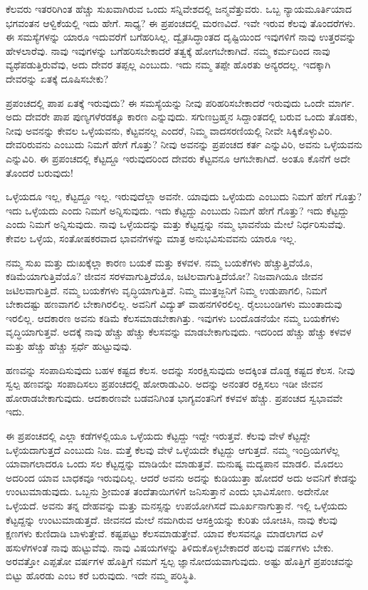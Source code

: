 ಕೆಲವರು ಇತರರಿಗಿಂತ ಹೆಚ್ಚು ಸುಖವಾಗಿರುವ ಒಂದು ಸನ್ನಿವೇಶದಲ್ಲಿ ಜನ್ಮವೆತ್ತುವರು. ಒಬ್ಬ ನ್ಯಾಯಮೂರ್ತಿಯಾದ ಭಗವಂತನ ಆಳ್ವಿಕೆಯಲ್ಲಿ ಇದು ಹೇಗೆ. ಸಾಧ್ಯ? ಈ ಪ್ರಪಂಚದಲ್ಲಿ ಮರಣವಿದೆ. ಇವೇ ಇರುವ ಕೆಲವು ತೊಂದರೆಗಳು. ಈ ಸಮಸ್ಯೆಗಳನ್ನು ಯಾರೂ ಇದುವರೆಗೆ ಬಗೆಹರಿಸಿಲ್ಲ. ದ್ವೈತಸಿದ್ಧಾಂತದ ದೃಷ್ಟಿಯಿಂದ ಇವುಗಳಿಗೆ ನಾವು ಉತ್ತರವನ್ನು ಹೇಳಲಾರೆವು. ನಾವು ಇವುಗಳನ್ನು ಬಗೆಹರಿಸಬೇಕಾದರೆ ತತ್ವಕ್ಕೆ ಹೋಗಬೇಕಾಗಿದೆ. ನಮ್ಮ ಕರ್ಮದಿಂದ ನಾವು ವ್ಯಥೆಪಡುತ್ತಿರುವೆವು, ಅದು ದೇವರ ತಪ್ಪಲ್ಲ ಎಂಬುದು. ಇದು ನಮ್ಮ ತಪ್ಪೇ ಹೊರತು ಅನ್ಯರದಲ್ಲ. ಇದಕ್ಕಾಗಿ ದೇವರನ್ನು ಏತಕ್ಕೆ ದೂಷಿಸಬೇಕು?

ಪ್ರಪಂಚದಲ್ಲಿ ಪಾಪ ಏತಕ್ಕೆ ಇರುವುದು? ಈ ಸಮಸ್ಯೆಯನ್ನು ನೀವು ಪರಿಹರಿಸಬೇಕಾದರೆ ಇರುವುದು ಒಂದೇ ಮಾರ್ಗ. ಅದು ದೇವರೇ ಪಾಪ ಪುಣ್ಯಗಳೆರಡಕ್ಕೂ ಕಾರಣ ಎನ್ನುವುದು. ಸಗುಣಬ್ರಹ್ಮನ ಸಿದ್ದಾಂತದಲ್ಲಿ ಬರುವ ಒಂದು ತೊಡಕು, ನೀವು ಅವನನ್ನು ಕೇವಲ ಒಳ್ಳೆಯವನು, ಕೆಟ್ಟವನಲ್ಲ ಎಂದರೆ, ನಿಮ್ಮ ವಾದಸರಣಿಯಲ್ಲಿ ನೀವೇ ಸಿಕ್ಕಿಕೊಳ್ಳುವಿರಿ. ದೇವರಿರುವನು ಎಂಬುದು ನಿಮಗೆ ಹೇಗೆ ಗೊತ್ತು? ನೀವು ಅವನನ್ನು ಪ್ರಪಂಚದ ಕರ್ತ ಎನ್ನುವಿರಿ, ಅವನು ಒಳ್ಳೆಯವನು ಎನ್ನುವಿರಿ. ಈ ಪ್ರಪಂಚದಲ್ಲಿ ಕೆಟ್ಟದ್ದೂ ಇರುವುದರಿಂದ ದೇವರು ಕೆಟ್ಟವನೂ ಆಗಬೇಕಾಗಿದೆ. ಅಂತೂ ಕೊನೆಗೆ ಅದೇ ತೊಂದರೆ ಬರುವುದು!

ಒಳ್ಳೆಯದೂ ಇಲ್ಲ, ಕೆಟ್ಟದ್ದೂ ಇಲ್ಲ. ಇರುವುದೆಲ್ಲಾ ಅವನೇ. ಯಾವುದು ಒಳ್ಳೆಯದು ಎಂಬುದು ನಿಮಗೆ ಹೇಗೆ ಗೊತ್ತು? ಇದು ಒಳ್ಳೆಯದು ಎಂದು ನಿಮಗೆ ಅನ್ನಿಸುವುದು. ಇದು ಕೆಟ್ಟದ್ದು ಎಂಬುದು ನಿಮಗೆ ಹೇಗೆ ಗೊತ್ತು? ಇದು ಕೆಟ್ಟದ್ದು ಎಂದು ನಿಮಗೆ ಅನ್ನಿಸುವುದು. ನಾವು ಒಳ್ಳೆಯದನ್ನು ಮತ್ತು ಕೆಟ್ಟದ್ದನ್ನು ನಮ್ಮ ಭಾವನೆಯ ಮೇಲೆ ನಿರ್ಧರಿಸುವೆವು. ಕೇವಲ ಒಳ್ಳೆಯ, ಸಂತೋಷಕರವಾದ ಭಾವನೆಗಳನ್ನು ಮಾತ್ರ ಅನುಭವಿಸುವವನು ಯಾರೂ ಇಲ್ಲ.

ನಮ್ಮ ಸುಖ ಮತ್ತು ದುಃಖಕ್ಕೆಲ್ಲಾ ಕಾರಣ ಬಯಕೆ ಮತ್ತು ಕಳವಳ. ನಮ್ಮ ಬಯಕೆಗಳು ಹೆಚ್ಚುತ್ತಿವೆಯೊ, ಕಡಿಮೆಯಾಗುತ್ತಿವೆಯೊ? ಜೀವನ ಸರಳವಾಗುತ್ತಿದೆಯೊ, ಜಟಿಲವಾಗುತ್ತಿದೆಯೋ? ನಿಜವಾಗಿಯೂ ಜೀವನ ಜಟಿಲವಾಗುತ್ತಿದೆ. ನಮ್ಮ ಬಯಕೆಗಳು ವೃದ್ಧಿಯಾಗುತ್ತಿವೆ. ನಿಮ್ಮ ಮುತ್ತಜ್ಜನಿಗೆ ನಿಮ್ಮ ಉಡುಪಾಗಲಿ, ನಿಮಗೆ ಬೇಕಾದಷ್ಟು ಹಣವಾಗಲಿ ಬೇಕಾಗಿರಲಿಲ್ಲ. ಅವನಿಗೆ ವಿದ್ಯುತ್ ವಾಹನಗಳಿರಲಿಲ್ಲ. ರೈಲುಬಂಡಿಗಳು ಮುಂತಾದುವು ಇರಲಿಲ್ಲ. ಆದಕಾರಣ ಅವನು ಕಡಿಮೆ ಕೆಲಸಮಾಡಬೇಕಾಗಿತ್ತು. ಇವುಗಳು ಬಂದೊಡನೆಯೇ ನಮ್ಮ ಬಯಕೆಗಳು ವೃದ್ಧಿಯಾಗುತ್ತವೆ. ಅದಕ್ಕೆ ನಾವು ಹೆಚ್ಚು ಹೆಚ್ಚು ಕೆಲಸವನ್ನು ಮಾಡಬೇಕಾಗುವುದು. ಇದರಿಂದ ಹೆಚ್ಚು ಹೆಚ್ಚು ಕಳವಳ ಮತ್ತು ಹೆಚ್ಚು ಹೆಚ್ಚು ಸ್ಪರ್ಧೆ ಹುಟ್ಟುವುವು.

ಹಣವನ್ನು ಸಂಪಾದಿಸುವುದು ಬಹಳ ಕಷ್ಟದ ಕೆಲಸ. ಅದನ್ನು ಸಂರಕ್ಷಿಸುವುದು ಅದಕ್ಕಿಂತ ದೊಡ್ಡ ಕಷ್ಟದ ಕೆಲಸ. ನೀವು ಸ್ವಲ್ಪ ಹಣವನ್ನು ಸಂಪಾದಿಸಲು ಪ್ರಪಂಚದಲ್ಲಿ ಹೋರಾಡುವಿರಿ. ಅದನ್ನು ಅನಂತರ ರಕ್ಷಿಸಲು ಇಡೀ ಜೀವನ ಹೋರಾಡಬೇಕಾಗುವುದು. ಆದಕಾರಣವೇ ಬಡವನಿಗಿಂತ ಭಾಗ್ಯವಂತನಿಗೆ ಕಳವಳ ಹೆಚ್ಚು. ಪ್ರಪಂಚದ ಸ್ವಭಾವವೇ ಇದು.

ಈ ಪ್ರಪಂಚದಲ್ಲಿ ಎಲ್ಲಾ ಕಡೆಗಳಲ್ಲಿಯೂ ಒಳ್ಳೆಯದು ಕೆಟ್ಟದ್ದು ಇದ್ದೇ ಇರುತ್ತವೆ. ಕೆಲವು ವೇಳೆ ಕೆಟ್ಟದ್ದೇ ಒಳ್ಳೆಯದಾಗುತ್ತದೆ ಎಂಬುದು ನಿಜ. ಮತ್ತೆ ಕೆಲವು ವೇಳೆ ಒಳ್ಳೆಯದೇ ಕೆಟ್ಟದ್ದು ಆಗುತ್ತದೆ. ನಮ್ಮ ಇಂದ್ರಿಯಗಳೆಲ್ಲ ಯಾವಾಗಲಾದರೂ ಒಂದು ಸಲ ಕೆಟ್ಟದ್ದನ್ನು ಮಾಡಿಯೇ ಮಾಡುತ್ತವೆ. ಮನುಷ್ಯ ಮದ್ಯಪಾನ ಮಾಡಲಿ. ಮೊದಲು ಅದರಿಂದ ಯಾವ ಬಾಧಕವೂ ಇರುವುದಿಲ್ಲ. ಆದರೆ ಅವನು ಅದನ್ನು ಕುಡಿಯುತ್ತಾ ಹೋದರೆ ಅದು ಅವನಿಗೆ ಕೇಡನ್ನು ಉಂಟುಮಾಡುವುದು. ಒಬ್ಬನು ಶ‍್ರೀಮಂತ ತಂದೆತಾಯಿಗಳಿಗೆ ಜನಿಸುತ್ತಾನೆ ಎಂದು ಭಾವಿಸೋಣ. ಅದೇನೋ ಒಳ್ಳೆಯದೆ. ಅವನು ತನ್ನ ದೇಹವನ್ನು ಮತ್ತು ಮನಸ್ಸನ್ನು ಉಪಯೋಗಿಸದೆ ಮೂರ್ಖನಾಗುತ್ತಾನೆ. ಇಲ್ಲಿ ಒಳ್ಳೆಯದು ಕೆಟ್ಟದ್ದನ್ನು ಉಂಟುಮಾಡುತ್ತದೆ. ಜೀವನದ ಮೇಲೆ ನಮಗಿರುವ ಆಸಕ್ತಿಯನ್ನು ಕುರಿತು ಯೋಚಿಸಿ, ನಾವು ಕೆಲವು ಕ್ಷಣಗಳು ಕುಣಿದಾಡಿ ಬಾಳುತ್ತೇವೆ. ಕಷ್ಟಪಟ್ಟು ಕೆಲಸಮಾಡುತ್ತೇವೆ. ಯಾವ ಕೆಲಸವನ್ನೂ ಮಾಡಲಾಗದ ಎಳೆ ಹಸುಳೆಗಳಂತೆ ನಾವು ಹುಟ್ಟುವೆವು. ನಾವು ವಿಷಯಗಳನ್ನು ತಿಳಿದುಕೊಳ್ಳಬೇಕಾದರೆ ಹಲವು ವರ್ಷಗಳು ಬೇಕು. ಅರವತ್ತೋ ಎಪ್ಪತೋ ವರ್ಷಗಳ ಹೊತ್ತಿಗೆ ನಮಗೆ ಸ್ವಲ್ಪ ಜ್ಞಾನೋದಯವಾಗುವುದು. ಅಷ್ಟು ಹೊತ್ತಿಗೆ ಪ್ರಪಂಚವನ್ನು ಬಿಟ್ಟು ಹೊರಡು ಎಂಬ ಕರೆ ಬರುವುದು. ಇದೇ ನಮ್ಮ ಪರಿಸ್ಥಿತಿ.

